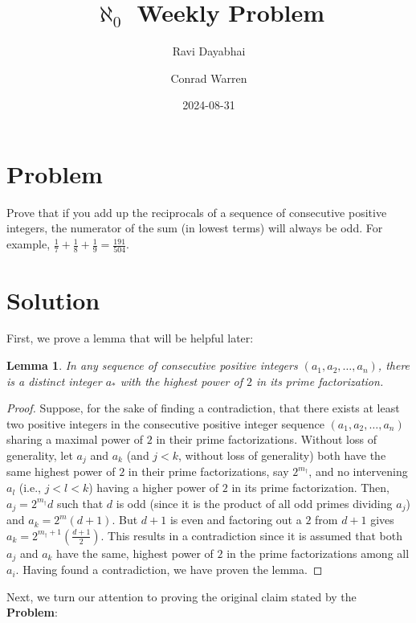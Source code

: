 \documentclass{article}
\title{$\aleph_{0}$ Weekly Problem}
\author{Ravi Dayabhai \and Conrad Warren}
\date{2024-08-31}
\newtheorem*{lemma}{Lemma}
\begin{document}
\maketitle

\section*{Problem}

Prove that if you add up the reciprocals of a sequence of consecutive positive integers, the numerator of the sum (in lowest terms) will always be odd. For example, $\frac{1}{7} + \frac{1}{8} + \frac{1}{9} = \frac{191}{504}$.

\section*{Solution}

First, we prove a lemma that will be helpful later:

\begin{lemma}
  In any sequence of consecutive positive integers $(a_{1}, a_{2}, \ldots, a_{n})$, there is a distinct integer $a_{*}$ with the highest power of $2$ in its prime factorization.
\end{lemma}

\begin{proof}
  Suppose, for the sake of finding a contradiction, that there exists at least two positive integers in the consecutive positive integer sequence $(a_{1}, a_{2}, \ldots, a_{n})$ sharing a maximal power of $2$ in their prime factorizations. 
  Without loss of generality, let $a_j$ and $a_k$ (and $j < k$, without loss of generality) both have the same highest power of $2$ in their prime factorizations, say $2^{m_{\dagger}}$, and no intervening $a_l$ (i.e., $j < l < k$) having a higher power of $2$ in its prime factorization.
  Then, $a_{j} = 2^{m_{\dagger}}d$ such that $d$ is odd (since it is the product of all odd primes dividing $a_{j}$) and $a_{k} = 2^{m}(d + 1)$.
  But $d+1$ is even and factoring out a $2$ from $d+1$ gives $a_{k} = 2^{m_{\dagger} + 1} \left(\frac{d + 1}{2}\right)$.
  This results in a contradiction since it is assumed that both $a_{j}$ and $a_{k}$ have the same, highest power of $2$ in the prime factorizations among all $a_i$.
  Having found a contradiction, we have proven the lemma.
\end{proof}
 
Next, we turn our attention to proving the original claim stated by the \textbf{Problem}:
\end{document}
